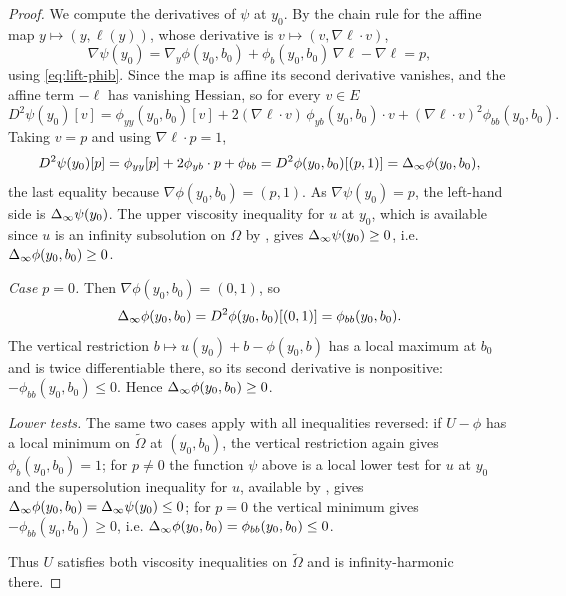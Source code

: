 \begin{proof}
We compute the derivatives of $\psi$ at $y_0$. By the chain rule for the affine
map $y\mapsto(y,\ell(y))$, whose derivative is $v\mapsto(v,\nabla\ell\cdot v)$,
\[
  \nabla\psi(y_0)=\nabla_y\phi(y_0,b_0)
      +\phi_b(y_0,b_0)\,\nabla\ell-\nabla\ell=p,
\]
using \eqref{eq:lift-phib}. Since the map is affine its second derivative
vanishes, and the affine term $-\ell$ has vanishing Hessian, so for every $v\in E$
\[
  D^2\psi(y_0)[v]
   =\phi_{yy}(y_0,b_0)[v]
     +2(\nabla\ell\cdot v)\,\phi_{yb}(y_0,b_0)\cdot v
     +(\nabla\ell\cdot v)^2\phi_{bb}(y_0,b_0).
\]
Taking $v=p$ and using $\nabla\ell\cdot p=1$,
\[
  D^2\psi(y_0)[p]
  =\phi_{yy}[p]+2\phi_{yb}\cdot p+\phi_{bb}
  =D^2\phi(y_0,b_0)[(p,1)]
  =\Delta_{\infty}\phi(y_0,b_0),
\]
the last equality because $\nabla\phi(y_0,b_0)=(p,1)$. As $\nabla\psi(y_0)=p$,
the left-hand side is $\Delta_{\infty}\psi(y_0)$. The upper viscosity inequality for $u$
at $y_0$, which is available since $u$ is an infinity subsolution on $\Omega$
by , gives $\Delta_{\infty}\psi(y_0)\ge0$, i.e.
$\Delta_{\infty}\phi(y_0,b_0)\ge0$.

\emph{Case $p=0$.} Then $\nabla\phi(y_0,b_0)=(0,1)$, so
\[
  \Delta_{\infty}\phi(y_0,b_0)=D^2\phi(y_0,b_0)[(0,1)]=\phi_{bb}(y_0,b_0).
\]
The vertical restriction $b\mapsto u(y_0)+b-\phi(y_0,b)$ has a local maximum at
$b_0$ and is twice differentiable there, so its second derivative is
nonpositive: $-\phi_{bb}(y_0,b_0)\le0$. Hence $\Delta_{\infty}\phi(y_0,b_0)\ge0$.

\emph{Lower tests.} The same two cases apply with all inequalities reversed:
if $U-\phi$ has a local minimum on $\widetilde\Omega$ at $(y_0,b_0)$, the
vertical restriction again gives $\phi_b(y_0,b_0)=1$; for $p\ne0$ the function
$\psi$ above is a local lower test for $u$ at $y_0$ and the supersolution
inequality for $u$, available by , gives
$\Delta_{\infty}\phi(y_0,b_0)=\Delta_{\infty}\psi(y_0)\le0$; for $p=0$ the vertical minimum gives
$-\phi_{bb}(y_0,b_0)\ge0$, i.e. $\Delta_{\infty}\phi(y_0,b_0)=\phi_{bb}(y_0,b_0)\le0$.

Thus $U$ satisfies both viscosity inequalities on $\widetilde\Omega$ and is
infinity-harmonic there.
\end{proof}
